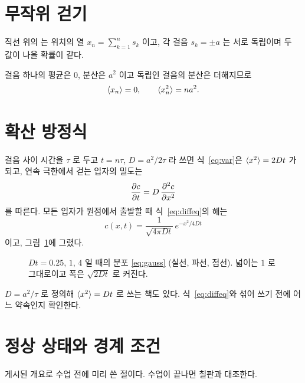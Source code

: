 \documentclass[11pt]{article}
\begin{document}
\section{무작위 걷기}\label{sec:walk}

\begin{definition}\label{def:walk}
직선 위의 는 위치의 열 $x_n = \sum_{k=1}^{n} s_k$ 이고,
각 걸음 $s_k=\pm a$ 는 서로 독립이며 두 값이 나올 확률이 같다.
\end{definition}

걸음 하나의 평균은 $0$, 분산은 $a^2$ 이고 독립인 걸음의 분산은 더해지므로
\begin{equation}\label{eq:var}
  \langle x_n \rangle = 0, \qquad \langle x_n^2 \rangle = n a^2 .
\end{equation}


\section{확산 방정식}\label{sec:diffusion}

걸음 사이 시간을 $\tau$ 로 두고 $t=n\tau$, $D=a^2/2\tau$ 라 쓰면 식~\eqref{eq:var}은
$\langle x^2 \rangle=2Dt$ 가 되고, 연속 극한에서 걷는 입자의 밀도는
\begin{equation}\label{eq:diffeq}
  \frac{\partial c}{\partial t} = D\,\frac{\partial^2 c}{\partial x^2}
\end{equation}
를 따른다. 모든 입자가 원점에서 출발할 때 식~\eqref{eq:diffeq}의 해는
\begin{equation}\label{eq:gauss}
  c(x,t) = \frac{1}{\sqrt{4\pi D t}}\, e^{-x^2/4Dt}
\end{equation}
이고, 그림~\ref{fig:diffusion}에 그렸다.

\begin{figure}[ht]
  \centering
  \figDiffusion
  \caption{$Dt=0.25$, $1$, $4$ 일 때의 분포 \eqref{eq:gauss} (실선, 파선, 점선).
  넓이는 $1$ 로 그대로이고 폭은 $\sqrt{2Dt}$ 로 커진다.}
  \label{fig:diffusion}
\end{figure}

\begin{caution}[두 가지 약속]\label{caut:dconv}
$D=a^2/\tau$ 로 정의해 $\langle x^2 \rangle=Dt$ 로 쓰는 책도 있다. 식~\eqref{eq:diffeq}와
섞어 쓰기 전에 어느 약속인지 확인한다.
\end{caution}


\section{정상 상태와 경계 조건}\label{sec:steady}

게시된 개요로 수업 전에 미리 쓴 절이다. 수업이 끝나면 칠판과 대조한다.

\label{lec:end}
\end{document}
